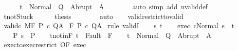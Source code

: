 \begin{isabellebody}
\ \ \ \ \isamarkupfalse%
\ {\isachardoublequoteopen}t{\isacharprime}\ {\isasymin}\ Normal\ {\isacharbackquote}\ Q\ {\isasymunion}\ Abrupt\ {\isacharbackquote}\ A{\isachardoublequoteclose}\isanewline
\ \ \ \ \ \ \isamarkupfalse%
\ {\isacharparenleft}auto\ simp\ add{\isacharcolon}\ nvalid{\isacharunderscore}def{\isacharparenright}\isanewline
\ \ \ \ \isamarkupfalse%
\ t{\isacharprime}{\isacharunderscore}notStuck\isanewline
\ \ \ \ \isamarkupfalse%
\ {\isacharquery}thesis\isanewline
\ \ \ \ \ \ \isamarkupfalse%
\ auto\isanewline
\ \ \isamarkupfalse%
\isanewline
{}\isamarkupfalse%
%
\endisatagproof
{\isafoldproof}%
%
\isadelimproof
\isanewline
%
\endisadelimproof
\isanewline
{}\isamarkupfalse%
\ valid{\isacharunderscore}restrict{\isacharunderscore}to{\isacharunderscore}valid{\isacharcolon}\isanewline
{}\ valid{\isacharunderscore}c{\isacharcolon}\ {\isachardoublequoteopen}{\isasymGamma}{\isacharbar}\isactrlbsub M\isactrlesub {\isasymTurnstile}\isactrlbsub {\isacharslash}F\isactrlesub \ P\ c\ Q{\isacharcomma}A{\isachardoublequoteclose}\isanewline
{}\ {\isachardoublequoteopen}{\isasymGamma}{\isasymTurnstile}\isactrlbsub {\isacharslash}F\isactrlesub \ P\ c\ Q{\isacharcomma}A{\isachardoublequoteclose}\isanewline
%
\isadelimproof
%
\endisadelimproof
%
\isatagproof
{}\isamarkupfalse%
\ {\isacharparenleft}rule\ validI{\isacharparenright}\isanewline
\ \ \isamarkupfalse%
\ s\ t\isanewline
\ \ \isamarkupfalse%
\ exec{\isacharcolon}\ {\isachardoublequoteopen}{\isasymGamma}{\isasymturnstile}{\isasymlangle}c{\isacharcomma}Normal\ s{\isasymrangle}\ {\isasymRightarrow}\ t{\isachardoublequoteclose}\ \isanewline
\ \ \isamarkupfalse%
\ P{\isacharcolon}\ {\isachardoublequoteopen}s\ {\isasymin}\ P{\isachardoublequoteclose}\isanewline
\ \ \isamarkupfalse%
\ t{\isacharunderscore}notin{\isacharunderscore}F{\isacharcolon}\ {\isachardoublequoteopen}t\ {\isasymnotin}\ Fault\ {\isacharbackquote}\ F{\isachardoublequoteclose}\isanewline
\ \ \isamarkupfalse%
\ {\isachardoublequoteopen}t\ {\isasymin}\ Normal\ {\isacharbackquote}\ Q\ {\isasymunion}\ Abrupt\ {\isacharbackquote}\ A{\isachardoublequoteclose}\isanewline
\ \ \isamarkupfalse%
\ {\isacharminus}\isanewline
\ \ \ \ \isamarkupfalse%
\ exec{\isacharunderscore}to{\isacharunderscore}exec{\isacharunderscore}restrict\ {\isacharbrackleft}OF\ exec{\isacharbrackright}\isanewline

\end{isabellebody}
